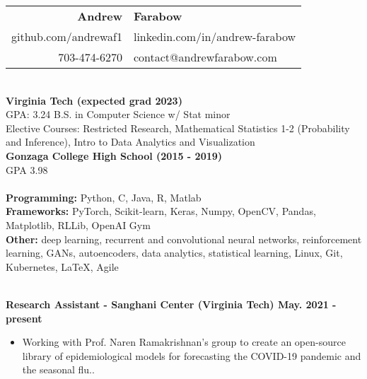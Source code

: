 \documentclass{article}
\begin{document}
  \begin{center}
    \begin{tabular}{r l}
      {\huge\textbf{Andrew}} & {\huge\textbf{Farabow}} \\
      \hspace{35pt} github.com/andrewaf1 & linkedin.com/in/andrew-farabow \\
      703-474-6270 & contact@andrewfarabow.com \\
    \end{tabular}


  \begin{flushleft}
    \begin{multicols}{2}
      {\large\textbf{\underline{}}} \\
      \textbf{Virginia Tech (expected grad 2023)} \\
      GPA: 3.24 \; B.S. in Computer Science w/ Stat minor \\
      Elective Courses: Restricted Research, Mathematical Statistics 1-2 (Probability and Inference), Intro to Data Analytics and Visualization\\
      \textbf{Gonzaga College High School	(2015 - 2019)} \\
      GPA 3.98 \\
     

    \columnbreak
    {\large\textbf{\underline{}}} \\
    {\textbf{Programming:}} Python, C, Java, R, Matlab \\
    {\textbf{Frameworks:}} PyTorch, Scikit-learn, Keras, Numpy, OpenCV, Pandas, Matplotlib, RLLib, OpenAI Gym \\
    {\textbf{Other:}} deep learning, recurrent and convolutional neural networks, reinforcement learning, GANs, autoencoders, data analytics, statistical learning, Linux, Git, Kubernetes, LaTeX, Agile \\

    \end{multicols}

    {\large\textbf{\underline{}}} \\

    \textbf{Research Assistant - Sanghani Center (Virginia Tech) \hfill May. 2021 - present}
    \begin{itemize}
      \itemsep0em
      \item Working with Prof. Naren Ramakrishnan's group to create an open-source library of epidemiological models for forecasting the COVID-19 pandemic and the seasonal flu.. 
    \end{itemize}
    

\end{flushleft}
\end{center}
\end{document}
